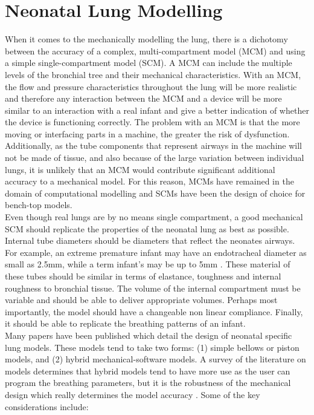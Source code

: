 \documentclass[12pt, openany, oneside]{book}
\begin{document}



\section{Neonatal Lung Modelling}
When it comes to the mechanically modelling the lung, there is a dichotomy between the accuracy of a complex, multi-compartment model (MCM) and using a simple single-compartment model (SCM). A MCM can include the multiple levels of the bronchial tree and their mechanical characteristics. With an MCM, the flow and pressure characteristics throughout the lung will be more realistic and therefore any interaction between the MCM and a device will be more similar to an interaction with a real infant and give a better indication of whether the device is functioning correctly. The problem with an MCM is that the more moving or interfacing parts in a machine, the greater the risk of dysfunction. Additionally, as the tube components that represent airways in the machine will not be made of tissue, and also because of the large variation between individual lungs, it is unlikely that an MCM would contribute significant additional accuracy to a mechanical model. For this reason, MCMs have remained in the domain of computational modelling and SCMs have been the design of choice for bench-top models. \\

Even though real lungs are by no means single compartment, a good mechanical SCM should replicate the properties of the neonatal lung as best as possible. Internal tube diameters should be diameters that reflect the neonates airways. For example, an extreme premature infant may have an endotracheal diameter as small as 2.5mm, while a term infant's may be up to 5mm \citep{ett}. These material of these tubes should be similar in terms of elastance, toughness and internal roughness to bronchial tissue. The volume of the internal compartment must be variable and should be able to deliver appropriate volumes. Perhaps most importantly, the model should have a changeable non linear compliance. Finally, it should be able to replicate the breathing patterns of an infant.\\

Many papers have been published which detail the design of neonatal specific lung models. These models tend to take two forms: (1) simple bellows or piston models, and (2) hybrid mechanical-software models. A survey of the literature on models determines that hybrid models tend to have more use as the user can program the breathing parameters, but it is the robustness of the mechanical design which really determines the model accuracy \citep{cecchini2011, cappa2002, frey2001, frey2000, scara2013, stank2017, measure}. Some of the key considerations include:\\
\end{document}
